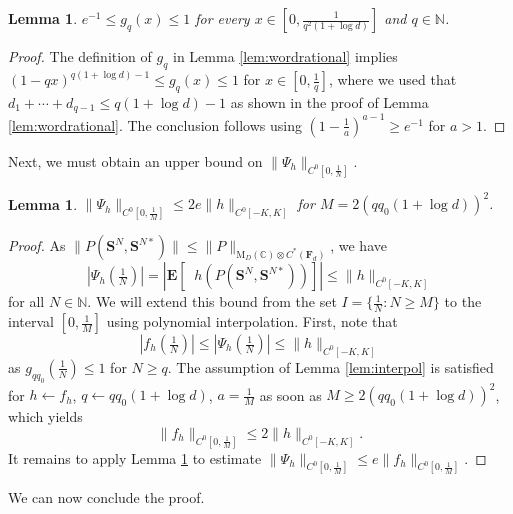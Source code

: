 \documentclass[10pt,reqno]{amsart}
\newtheorem{lem}[thm]{Lemma}
\theoremstyle{definition}
\theoremstyle{remark}
\numberwithin{equation}{section}
\numberwithin{figure}{section}
\numberwithin{table}{section}
\newcommand{\ntrND}{\mathop{\mathrm{tr}_{DN}}}
\newcommand{\EE}{\mathbf{E}}
\begin{document}
\begin{lem}
\label{lem:gconst}
$e^{-1} \le g_{q}(x)\le 1$ for every
$x\in[0,\frac{1}{q^2(1+\log d)}]$ and $q\in\mathbb{N}$.
\end{lem}

\begin{proof}
The definition of $g_q$ in Lemma \ref{lem:wordrational} implies 
$(1-qx)^{q(1+\log d)-1} \le g_q(x) \le 1$ for $x\in[0,\frac{1}{q}]$, where 
we used that $d_1+\cdots+d_{q-1}\le q(1+\log d)-1$ as shown in the proof 
of Lemma \ref{lem:wordrational}. The conclusion follows using 
$(1-\frac{1}{a})^{a-1} \ge e^{-1}$ for $a>1$.
\end{proof}

Next, we must obtain an upper bound on $\|\Psi_h\|_{C^0[0,\frac{1}{N}]}$.

\begin{lem}
\label{lem:psihbd}
$\|\Psi_h\|_{C^0[0,\frac{1}{M}]}\le 2e\|h\|_{C^0[-K,K]}$
for $M=2(qq_0(1+\log d))^2$.
\end{lem}

\begin{proof}
As $\|P(\boldsymbol{S}^N,\boldsymbol{S}^{N*})\| \le 
\|P\|_{\mathrm{M}_D(\mathbb{C})\otimes C^*(\mathbf{F}_d)}$, we have
$$
	|\Psi_h(\tfrac{1}{N})| =
	|\EE[\ntrND h(P(\boldsymbol{S}^N,\boldsymbol{S}^{N*}))]|
	\le \|h\|_{C^0[-K,K]}	
$$
for all $N\in\mathbb{N}$. We will extend this bound from the
set $I=\{\frac{1}{N}:N\ge M\}$ to the interval $[0,\frac{1}{M}]$
using polynomial interpolation.
First, note that 
$$
	|f_h(\tfrac{1}{N})| \le |\Psi_h(\tfrac{1}{N})| \le \|h\|_{C^0[-K,K]}
$$
as $g_{qq_0}(\frac{1}{N})\le 1$ for $N\ge q$.
The assumption of Lemma \ref{lem:interpol}
is satisfied for $h\leftarrow f_h$, $q\leftarrow qq_0(1+\log d)$, 
$a=\frac{1}{M}$ as soon as $M\ge 2(qq_0(1+\log d))^2$, which 
yields
$$
	\|f_h\|_{C^0[0,\frac{1}{M}]} \le
	2\|h\|_{C^0[-K,K]}.
$$
It remains to apply
Lemma \ref{lem:gconst} to estimate $\|\Psi_h\|_{C^0[0,\frac{1}{M}]}
\le e\|f_h\|_{C^0[0,\frac{1}{M}]}$.
\end{proof}

We can now conclude the proof.
\end{document}
